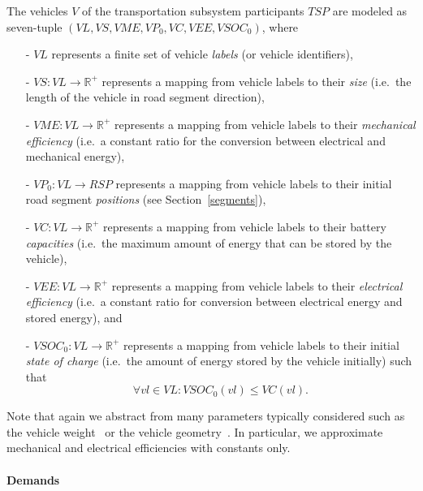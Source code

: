 The vehicles $V$ of the transportation subsystem participants $TSP$ are modeled as seven-tuple $(VL, VS, VME, VP_0, VC, VEE, VSOC_0)$, where
\begin{itemize}
	\item[-] $VL$ represents a finite set of vehicle \textit{labels} (or vehicle identifiers),
	\item[-] $VS: VL \rightarrow \mathbb{R}^+$ represents a mapping from vehicle labels to their \textit{size} (i.e.\ the length of the vehicle in road segment direction),
	\item[-] $VME: VL \rightarrow \mathbb{R}^+$ represents a mapping from vehicle labels to their \textit{mechanical efficiency} (i.e.\ a constant ratio for the conversion between electrical and mechanical energy),
	\item[-] $VP_0: VL \rightarrow RSP$ represents a mapping from vehicle labels to their initial road segment \textit{positions} (see Section~\ref{segments}),
	\item[-] $VC: VL \rightarrow \mathbb{R}^+$ represents a mapping from vehicle labels to their battery \textit{capacities} (i.e.\ the maximum amount of energy that can be stored by the vehicle),
	\item[-] $VEE: VL \rightarrow \mathbb{R}^+$ represents a mapping from vehicle labels to their \textit{electrical efficiency} (i.e.\ a constant ratio for conversion between electrical energy and stored energy), and
	\item[-] $VSOC_0: VL \rightarrow \mathbb{R}^+$ represents a mapping from vehicle labels to their initial \textit{state of charge} (i.e.\ the amount of energy stored by the vehicle initially) such that
	\[
		\forall vl \in VL : VSOC_0(vl) \leq VC(vl) \textrm{.}
	\]
\end{itemize}
Note that again we abstract from many parameters typically considered such as the vehicle weight~\cite{?} or the vehicle geometry~\cite{?}. In particular, we approximate mechanical and electrical efficiencies with constants only.


\paragraph{Demands}
\label{demands}

